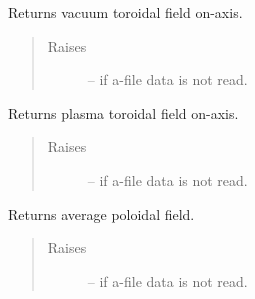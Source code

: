 \documentclass[letterpaper,10pt,english]{sphinxmanual}
\begin{document}
\begin{fulllineitems}
\begin{fulllineitems}
\end{fulllineitems}


\begin{fulllineitems}
\label{eqtools:eqtools.eqdskreader.EqdskReader.getBtVac}
Returns vacuum toroidal field on-axis.
\begin{quote}\begin{description}
\item[{Raises}] \leavevmode
{} -- 
if a-file data is not read.

\end{description}\end{quote}

\end{fulllineitems}


\begin{fulllineitems}
\label{eqtools:eqtools.eqdskreader.EqdskReader.getBtPla}
Returns plasma toroidal field on-axis.
\begin{quote}\begin{description}
\item[{Raises}] \leavevmode
{} -- 
if a-file data is not read.

\end{description}\end{quote}

\end{fulllineitems}


\begin{fulllineitems}
\label{eqtools:eqtools.eqdskreader.EqdskReader.getBpAvg}
Returns average poloidal field.
\begin{quote}\begin{description}
\item[{Raises}] \leavevmode
{} -- 
if a-file data is not read.

\end{description}\end{quote}

\end{fulllineitems}


\end{fulllineitems}
\end{document}
